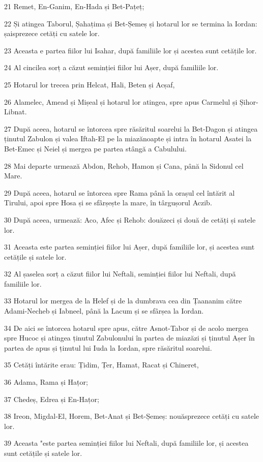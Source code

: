 \par 21 Remet, En-Ganim, En-Hada și Bet-Pațeț;
\par 22 Și atingea Taborul, Șahațima și Bet-Șemeș și hotarul lor se termina la Iordan: șaisprezece cetăți cu satele lor.
\par 23 Aceasta e partea fiilor lui Isahar, după familiile lor și acestea sunt cetățile lor.
\par 24 Al cincilea sorț a căzut seminției fiilor lui Așer, după familiile lor.
\par 25 Hotarul lor trecea prin Helcat, Hali, Beten și Acșaf,
\par 26 Alamelec, Amead și Mișeal și hotarul lor atingea, spre apus Carmelul și Șihor-Libnat.
\par 27 După aceea, hotarul se întorcea spre răsăritul soarelui la Bet-Dagon și atingea ținutul Zabulon și valea Iftah-El pe la miazănoapte și intra în hotarul Asatei la Bet-Emec și Neiel și mergea pe partea stângă a Cabulului.
\par 28 Mai departe urmează Abdon, Rehob, Hamon și Cana, până la Sidonul cel Mare.
\par 29 După aceea, hotarul se întorcea spre Rama până la orașul cel întărit al Tirului, apoi spre Hosa și se sfârșește la mare, în târgușorul Aczib.
\par 30 După aceea, urmează: Aco, Afec și Rehob: douăzeci și două de cetăți și satele lor.
\par 31 Aceasta este partea seminției fiilor lui Așer, după familiile lor, și acestea sunt cetățile și satele lor.
\par 32 Al șaselea sorț a căzut fiilor lui Neftali, seminției fiilor lui Neftali, după familiile lor.
\par 33 Hotarul lor mergea de la Helef și de la dumbrava cea din Țaananim către Adami-Necheb și Iabneel, până la Lacum și se sfârșea la Iordan.
\par 34 De aici se întorcea hotarul spre apus, către Asnot-Tabor și de acolo mergea spre Hucoc și atingea ținutul Zabulonului în partea de miazăzi și ținutul Așer în partea de apus și ținutul lui Iuda la Iordan, spre răsăritul soarelui.
\par 35 Cetăți întărite erau: Țidim, Țer, Hamat, Racat și Chineret,
\par 36 Adama, Rama și Hațor;
\par 37 Chedeș, Edrea și En-Hațor;
\par 38 Ireon, Migdal-El, Horem, Bet-Anat și Bet-Șemeș: nouăsprezece cetăți cu satele lor.
\par 39 Aceasta "este partea seminției fiilor lui Neftali, după familiile lor, și acestea sunt cetățile și satele lor.

